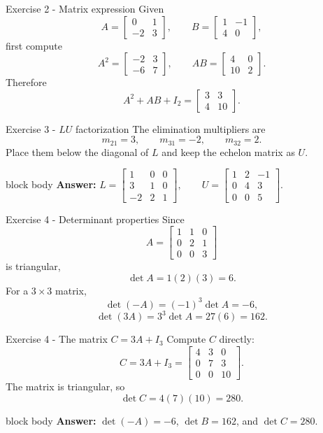 \documentclass[aspectratio=169]{beamer}
\newcommand{\answerbox}[1]{%
  \begin{beamercolorbox}[sep=1.0ex,wd=\linewidth]{block body}
    \textbf{Answer:} #1
  \end{beamercolorbox}}
\begin{document}
\begin{frame}{Exercise 2 - Matrix expression}
Given
\[
A=\begin{bmatrix}0&1\\-2&3\end{bmatrix},
\qquad
B=\begin{bmatrix}1&-1\\4&0\end{bmatrix},
\]
first compute
\[
A^2=\begin{bmatrix}-2&3\\-6&7\end{bmatrix},
\qquad
AB=\begin{bmatrix}4&0\\10&2\end{bmatrix}.
\]
Therefore
\[
A^2+AB+I_2
=\boxed{\begin{bmatrix}3&3\\4&10\end{bmatrix}}.
\]
\end{frame}

\begin{frame}{Exercise 3 - $LU$ factorization}
The elimination multipliers are
\[
m_{21}=3,
\qquad
m_{31}=-2,
\qquad
m_{32}=2.
\]
Place them below the diagonal of $L$ and keep the echelon matrix as $U$.
\answerbox{$\displaystyle
\boxed{L=\begin{bmatrix}1&0&0\\3&1&0\\-2&2&1\end{bmatrix}},
\qquad
\boxed{U=\begin{bmatrix}1&2&-1\\0&4&3\\0&0&5\end{bmatrix}}$.}
\end{frame}

\begin{frame}{Exercise 4 - Determinant properties}
Since
\[
A=\begin{bmatrix}1&1&0\\0&2&1\\0&0&3\end{bmatrix}
\]
is triangular,
\[
\det A=1(2)(3)=6.
\]
For a $3\times3$ matrix,
\[
\det(-A)=(-1)^3\det A=\boxed{-6},
\]
\[
\det(3A)=3^3\det A=27(6)=\boxed{162}.
\]
\end{frame}

\begin{frame}{Exercise 4 - The matrix $C=3A+I_3$}
Compute $C$ directly:
\[
C=3A+I_3
=\begin{bmatrix}
4&3&0\\0&7&3\\0&0&10
\end{bmatrix}.
\]
The matrix is triangular, so
\[
\det C=4(7)(10)=\boxed{280}.
\]
\answerbox{$\det(-A)=-6$, $\det B=162$, and $\det C=280$.}
\end{frame}
\end{document}
